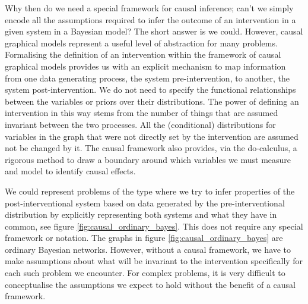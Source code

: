 \documentclass[11pt,a4paper,oneside]{book}
\theoremstyle{plain}
\theoremstyle{definition}
\begin{document}
Why then do we need a special framework for causal inference; can't we simply encode all the assumptions required to infer the outcome of an intervention in a given system in a Bayesian model? The short answer is we could. However, causal graphical models represent a useful level of abstraction for many problems. Formalising the definition of an intervention within the framework of causal graphical models provides us with an explicit mechanism to map information from one data generating process, the system pre-intervention, to another, the system post-intervention. We do not need to specify the functional relationships between the variables or priors over their distributions. The power of defining an intervention in this way stems from the number of things that are assumed invariant between the two processes. All the (conditional) distributions for variables in the graph that were not directly set by the intervention are assumed not be changed by it. The causal framework also provides, via the do-calculus, a rigorous method to draw a boundary around which variables we must measure and model to identify causal effects.  

We could represent problems of the type where we try to infer properties of the post-interventional system based on data generated by the pre-interventional distribution by explicitly representing both systems and what they have in common, see figure \ref{fig:causal_ordinary_bayes}. This does not require any special framework or notation. The graphs in figure  \ref{fig:causal_ordinary_bayes} are ordinary Bayesian networks. However, without a causal framework, we have to make assumptions about what will be invariant to the intervention specifically for each such problem we encounter. For complex problems, it is very difficult to conceptualise the assumptions we expect to hold without the benefit of a causal framework.  
\end{document}
